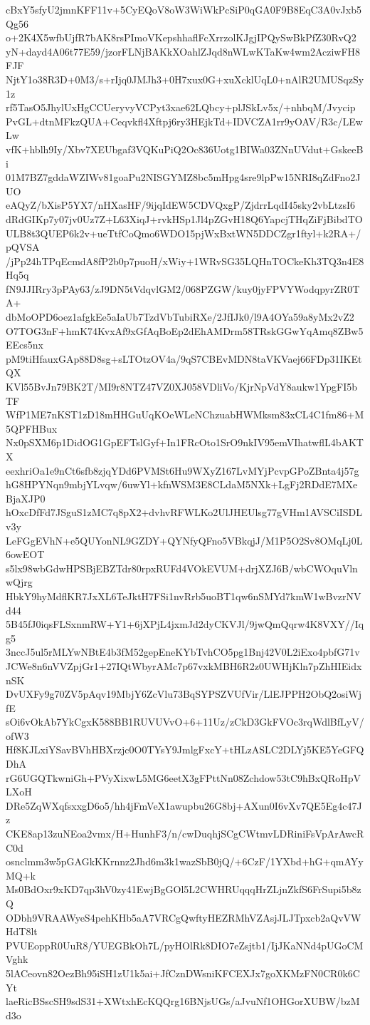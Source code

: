 cBxY5sfyU2jmnKFF11v+5CyEQoV8oW3WiWkPcSiP0qGA0F9B8EqC3A0vJxb5Qg56
o+2K4X5wfbUjfR7bAK8rsPImoVKepshhaflFcXrrzolKJgjIPQySwBkPfZ30RvQ2
yN+dayd4A06t77E59/jzorFLNjBAKkXOahlZJqd8nWLwKTaKw4wm2AcziwFH8FJF
NjtY1o38R3D+0M3/s+rIjq0JMJh3+0H7xux0G+xuXcklUqL0+nAlR2UMUSqzSy1z
rf5TasO5JhylUxHgCCUeryvyVCPyt3xae62LQbcy+plJSkLv5x/+nhbqM/Jvycip
PvGL+dtnMFkzQUA+Ceqvkfl4Xftpj6ry3HEjkTd+IDVCZA1rr9yOAV/R3c/LEwLw
vfK+hblh9Iy/Xbv7XEUbgaf3VQKuPiQ2Oc836Uotg1BIWa03ZNnUVdut+GskeeBi
01M7BZ7gddaWZIWv81goaPu2NISGYMZ8bc5mHpg4sre9lpPw15NRI8qZdFno2JUO
eAQyZ/bXisP5YX7/nHXasHF/9ijqIdEW5CDVQxgP/ZjdrrLqdI45sky2vbLtzsI6
dRdGIKp7y07jv0Uz7Z+L63XiqJ+rvkHSp1Jl4pZGvH18Q6YapcjTHqZiFjBibdTO
ULB8t3QUEP6k2v+ueTtfCoQmo6WDO15pjWxBxtWN5DDCZgr1ftyl+k2RA+/pQVSA
/jPp24hTPqEcmdA8fP2b0p7puoH/xWiy+1WRvSG35LQHnTOCkeKh3TQ3n4E8Hq5q
fN9JJIRry3pPAy63/zJ9DN5tVdqvlGM2/068PZGW/kuy0jyFPVYWodqpyrZR0TA+
dbMoOPD6oez1afgkEe5aIaUb7TzdVbTubiRXe/2JfIJk0/l9A4OYa59a8yMx2vZ2
O7TOG3nF+hmK74KvxAf9xGfAqBoEp2dEhAMDrm58TRskGGwYqAmq8ZBw5EEcs5nx
pM9tiHfauxGAp88D8sg+sLTOtzOV4a/9qS7CBEvMDN8taVKVaej66FDp31IKEtQX
KVl55BvJn79BK2T/MI9r8NTZ47VZ0XJ058VDliVo/KjrNpVdY8aukw1YpgFI5bTF
WfP1ME7nKST1zD18mHHGuUqKOeWLeNChzuabHWMksm83xCL4C1fm86+M5QPFHBux
Nx0pSXM6p1DidOG1GpEFTslGyf+In1FRcOto1SrO9nkIV95emVIhatwflL4bAKTX
eexhriOa1e9nCt6sfb8zjqYDd6PVMSt6Hu9WXyZ167LvMYjPcvpGPoZBnta4j57g
hG8HPYNqn9mbjYLvqw/6uwYl+kfnWSM3E8CLdaM5NXk+LgFj2RDdE7MXeBjaXJP0
hOxcDfFd7JSguS1zMC7q8pX2+dvhvRFWLKo2UlJHEUlsg77gVHm1AVSCiISDLv3y
LeFGgEVhN+e5QUYonNL9GZDY+QYNfyQFno5VBkqjJ/M1P5O2Sv8OMqLj0L6owEOT
s5lx98wbGdwHPSBjEBZTdr80rpxRUFd4VOkEVUM+drjXZJ6B/wbCWOquVlnwQjrg
HbkY9hyMdflKR7JxXL6TeJktH7FSi1nvRrb5uoBT1qw6nSMYd7kmW1wBvzrNVd44
5B45fJ0iqsFLSxnmRW+Y1+6jXPjL4jxmJd2dyCKVJl/9jwQmQqrw4K8VXY//Iqg5
3nccJ5ul5rMLYwNBtE4b3fM52gepEneKYbTvhCO5pg1Bnj42V0L2iExo4pbfG71v
JCWe8n6nVVZpjGr1+27IQtWbyrAMc7p67vxkMBH6R2z0UWHjKln7pZhHIEidxnSK
DvUXFy9g70ZV5pAqv19MbjY6ZcVlu73BqSYPSZVUfVir/LlEJPPH2ObQ2osiWjfE
sOi6vOkAb7YkCgxK588BB1RUVUVvO+6+11Uz/zCkD3GkFVOc3rqWdlBfLyV/ofW3
Hf8KJLxiYSavBVhHBXrzjc0O0TYsY9JmlgFxcY+tHLzASLC2DLYj5KE5YeGFQDhA
rG6UGQTkwniGh+PVyXixwL5MG6eetX3gFPttNn08Zchdow53tC9hBxQRoHpVLXoH
DRe5ZqWXqfsxxgD6o5/hh4jFmVeX1awupbu26G8bj+AXun0I6vXv7QE5Eg4c47Jz
CKE8ap13zuNEoa2vmx/H+HunhF3/n/cwDuqhjSCgCWtmvLDRiniFsVpArAwcRC0d
osnclmm3w5pGAGkKKrnnz2Jhd6m3k1wazSbB0jQ/+6CzF/1YXbd+hG+qmAYyMQ+k
Ms0BdOxr9xKD7qp3hV0zy41EwjBgGOl5L2CWHRUqqqHrZLjnZkfS6FrSupi5b8zQ
ODbh9VRAAWyeS4pehKHb5aA7VRCgQwftyHEZRMhVZAsjJLJTpxcb2aQvVWHdT8lt
PVUEoppR0UuR8/YUEGBkOh7L/pyHOlRk8DIO7eZsjtb1/IjJKaNNd4pUGoCMVghk
5lACeovn82OezBh95iSH1zU1k5ai+JfCznDWsniKFCEXJx7goXKMzFN0CR0k6CYt
laeRicBSscSH9sdS31+XWtxhEcKQQrg16BNjsUGs/aJvuNf1OHGorXUBW/bzMd3o
